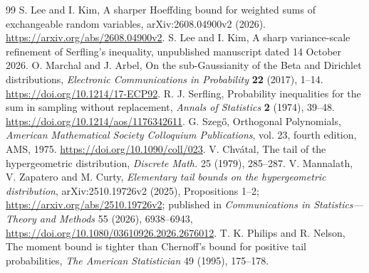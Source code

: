 \documentclass[11pt,a4paper]{article}
\begin{document}
\begin{thebibliography}{99}
 S. Lee and I. Kim, A sharper Hoeffding bound for weighted sums of exchangeable random variables, arXiv:2608.04900v2 (2026). \url{https://arxiv.org/abs/2608.04900v2}.
 S. Lee and I. Kim, A sharp variance-scale refinement of Serfling's inequality, unpublished manuscript dated 14 October 2026.
 O. Marchal and J. Arbel, On the sub-Gaussianity of the Beta and Dirichlet distributions, \emph{Electronic Communications in Probability} \textbf{22} (2017), 1--14. \url{https://doi.org/10.1214/17-ECP92}.
 R. J. Serfling, Probability inequalities for the sum in sampling without replacement, \emph{Annals of Statistics} \textbf{2} (1974), 39--48. \url{https://doi.org/10.1214/aos/1176342611}.
 G. Szeg\H{o}, Orthogonal Polynomials, \emph{American Mathematical Society Colloquium Publications}, vol. 23, fourth edition, AMS, 1975. \url{https://doi.org/10.1090/coll/023}.
 V. Chv\'atal, The tail of the hypergeometric distribution,
\emph{Discrete Math.} 25 (1979), 285--287.
 V. Mannalath, V. Zapatero and M. Curty,
\emph{Elementary tail bounds on the hypergeometric distribution},
arXiv:2510.19726v2 (2025), Propositions 1--2;
\url{https://arxiv.org/abs/2510.19726v2}; published in
\emph{Communications in Statistics---Theory and Methods} 55 (2026),
6938--6943, \url{https://doi.org/10.1080/03610926.2026.2676012}.
 T. K. Philips and R. Nelson, The moment bound is tighter than
Chernoff's bound for positive tail probabilities,
\emph{The American Statistician} 49 (1995), 175--178.
\end{thebibliography}
\end{document}
